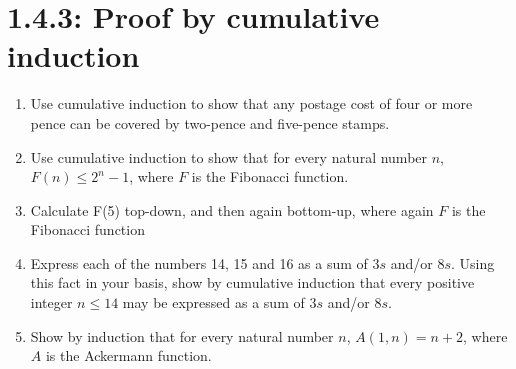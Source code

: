 \documentclass{article}
\begin{document}
\section*{1.4.3: Proof by cumulative induction}
\begin{enumerate}
    \item Use cumulative induction to show that any postage cost of four or more pence can be covered by two-pence and five-pence stamps.
    \item Use cumulative induction to show that for every natural number $n$, $F(n) \leq 2^{n}-1$, where $F$ is the Fibonacci function.
    \item Calculate F(5) top-down, and then again bottom-up, where again $F$ is the Fibonacci function
    \item Express each of the numbers 14, 15 and 16 as a sum of $3s$ and/or $8s$. Using this fact in your basis, show by cumulative induction that every positive integer $n \leq 14$ may be expressed as a sum of $3s$ and/or $8s$.
    \item Show by induction that for every natural number $n$, $A(1,n) = n+2$, where $A$ is the Ackermann function.
\end{enumerate}
\end{document}
